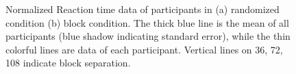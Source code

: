 \begin{figure}[ht]
\centering
{}
\decoRule
\caption[Normalized Reaction time data of participants]{Normalized Reaction time data of participants in (a) randomized condition (b) block condition. The thick blue line is the mean of all participants (blue shadow indicating standard error), while the thin colorful lines are data of each participant. Vertical lines on 36, 72, 108 indicate block separation. }
\label{fig:Normalized Reaction Time Participants}
\end{figure}


